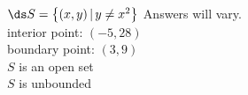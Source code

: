 {$\ds S = \left\{(x,y)\,| \, y\neq x^2\right\}$}
{Answers will vary.\\
interior point: $(-5,28)$\\
boundary point: $(3,9)$\\
$S$ is an open set\\
$S$ is unbounded
}